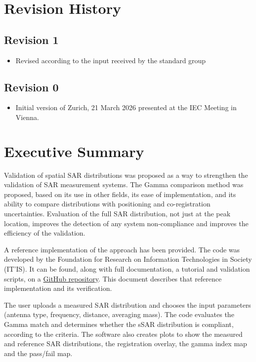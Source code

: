 \documentclass{./class/itisreport}
\newcommand{\git}{https://github.com/ITISFoundation/SAR-Pattern-Validation}
\begin{document}
\section*{Revision History \label{sec:revision}}
\subsection*{Revision 1}
\begin{itemize}
    \item Revised according to the input received by the standard group
\end{itemize}
\subsection*{Revision 0}
\begin{itemize}
    \item Initial version of Zurich, 21 March 2026 presented at the IEC Meeting in Vienna.
\end{itemize}
\clearpage

\section*{Executive Summary \label{sec:exec_summary}}

Validation of spatial SAR distributions was proposed as a way to strengthen the validation of SAR measurement systems. The Gamma comparison method was proposed, based on its use in other fields, its ease of implementation, and its ability to compare distributions with positioning and co-registration uncertainties. Evaluation of the full SAR distribution, not just at the peak location, improves the detection of any system non-compliance and improves the efficiency of the validation.

A reference implementation of the approach has been provided. The code was developed by the Foundation for Research on Information Technologies in Society (IT'IS). It can be found, along with full documentation, a tutorial and validation scripts, on a \href{\git}{GitHub repository}. This document describes that reference implementation and its verification. 

The user uploads a measured SAR distribution and chooses the input parameters (antenna type, frequency, distance, averaging mass).
The code evaluates the Gamma match and determines whether the sSAR distribution is compliant, according to the criteria. The software also creates plots to show the measured and reference SAR distributions, the registration overlay, the gamma index map and the pass/fail map.
\end{document}
